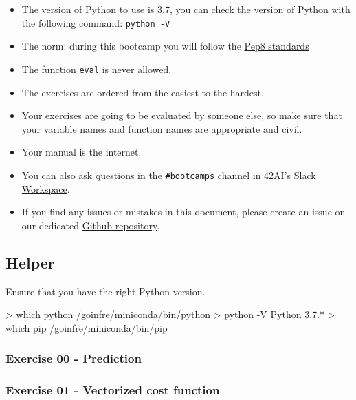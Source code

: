 \documentclass[]{article}
\newenvironment{Shaded}{\begin{snugshade}}{\end{snugshade}}
\newcommand{\NormalTok}[1]{\textcolor[rgb]{0.81,0.81,0.76}{#1}}
\begin{document}
\begin{itemize}
\item
  The version of Python to use is 3.7, you can check the version of
  Python with the following command: \texttt{python\ -V}
\item
  The norm: during this bootcamp you will follow the
  \href{https://www.python.org/dev/peps/pep-0008/}{Pep8 standards}
\item
  The function \texttt{eval} is never allowed.
\item
  The exercises are ordered from the easiest to the hardest.
\item
  Your exercises are going to be evaluated by someone else, so make sure
  that your variable names and function names are appropriate and civil.
\item
  Your manual is the internet.
\item
  You can also ask questions in the \texttt{\#bootcamps} channel in
  \href{https://42-ai.slack.com}{42AI's Slack Workspace}.
\item
  If you find any issues or mistakes in this document, please create an
  issue on our dedicated
  \href{https://github.com/42-AI/bootcamp_machine-learning/issues}{Github
  repository}.
\end{itemize}

\hypertarget{helper}{%
\subsection{Helper}\label{helper}}

Ensure that you have the right Python version.

\begin{Shaded}
\begin{Highlighting}[]
\NormalTok{> which python}
\NormalTok{/goinfre/miniconda/bin/python}
\NormalTok{> python -V}
\NormalTok{Python 3.7.*}
\NormalTok{> which pip}
\NormalTok{/goinfre/miniconda/bin/pip}
\end{Highlighting}
\end{Shaded}

\hypertarget{exercise-00---prediction}{%
\subsubsection{Exercise 00 -
Prediction}\label{exercise-00---prediction}}

\hypertarget{exercise-01---vectorized-cost-function}{%
\subsubsection{Exercise 01 - Vectorized cost
function}\label{exercise-01---vectorized-cost-function}}
\end{document}
